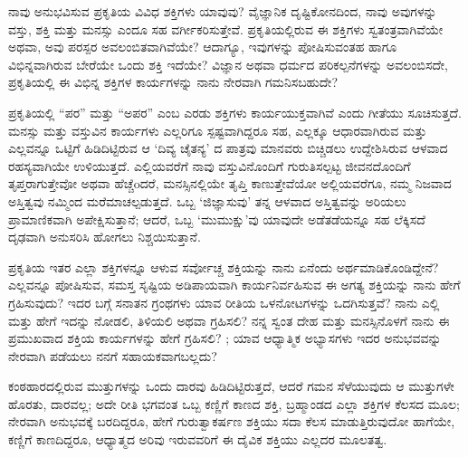 \begin{mananam}{}
\nfntmtxt ನಾವು ಅನುಭವಿಸುವ ಪ್ರಕೃತಿಯ ವಿವಿಧ ಶಕ್ತಿಗಳು ಯಾವುವು?  ವೈಜ್ಞಾನಿಕ ದೃಷ್ಟಿಕೋನದಿಂದ, ನಾವು ಅವುಗಳನ್ನು ವಸ್ತು, ಶಕ್ತಿ ಮತ್ತು ಮನಸ್ಸು ಎಂದೂ ಸಹ ವರ್ಗೀಕರಿಸುತ್ತೇವೆ. ಪ್ರಕೃತಿಯಲ್ಲಿರುವ ಈ ಶಕ್ತಿಗಳು ಸ್ವತಂತ್ರವಾಗಿವೆಯೇ ಅಥವಾ, ಅವು ಪರಸ್ಪರ ಅವಲಂಬಿತವಾಗಿವೆಯೇ? ಆದಾಗ್ಯೂ, ಇವುಗಳನ್ನು ಪೋಷಿಸುವಂತಹ ಹಾಗೂ ವಿಭಿನ್ನವಾಗಿರುವ ಬೇರೆಯೇ ಒಂದು ಶಕ್ತಿ ಇದೆಯೇ? ವಿಜ್ಞಾನ ಅಥವಾ ಧರ್ಮದ ಪರಿಕಲ್ಪನೆಗಳನ್ನು ಅವಲಂಬಿಸದೇ, ಪ್ರಕೃತಿಯಲ್ಲಿ ಈ ವಿಭಿನ್ನ ಶಕ್ತಿಗಳ ಕಾರ್ಯಗಳನ್ನು ನಾನು ನೇರವಾಗಿ ಗಮನಿಸಬಹುದೇ?
\end{mananam}
\sReflect
\begin{inspiration}{}
\nfntmtxt ಪ್ರಕೃತಿಯಲ್ಲಿ “ಪರ” ಮತ್ತು “ಅಪರ” ಎಂಬ ಎರಡು ಶಕ್ತಿಗಳು ಕಾರ್ಯಯುಕ್ತವಾಗಿವೆ ಎಂದು ಗೀತೆಯು ಸೂಚಿಸುತ್ತದೆ. ಮನಸ್ಸು ಮತ್ತು ವಸ್ತುವಿನ ಕಾರ್ಯಗಳು ಎಲ್ಲರಿಗೂ ಸ್ಪಷ್ಟವಾಗಿದ್ದರೂ ಸಹ, ಎಲ್ಲಕ್ಕೂ ಆಧಾರವಾಗಿರುವ ಮತ್ತು ಎಲ್ಲವನ್ನೂ ಒಟ್ಟಿಗೆ ಹಿಡಿದಿಟ್ಟಿರುವ ಆ  ‘ದಿವ್ಯ ಚೈತನ್ಯ’ ದ  ಪಾತ್ರವು ಮಾನವರು ಬಿಚ್ಚಿಡಲು ಉದ್ದೇಶಿಸಿರುವ ಆಳವಾದ ರಹಸ್ಯವಾಗಿಯೇ ಉಳಿಯುತ್ತದೆ. ಎಲ್ಲಿಯವರೆಗೆ ನಾವು ವಸ್ತುವಿನೊಂದಿಗೆ ಗುರುತಿಸಲ್ಪಟ್ಟ ಜೀವನದೊಂದಿಗೆ ತೃಪ್ತರಾಗುತ್ತೇವೋ ಅಥವಾ ಹೆಚ್ಚೆoದರೆ, ಮನಸ್ಸಿನಲ್ಲಿಯೇ ತೃಪ್ತಿ ಕಾಣುತ್ತೇವೆಯೋ ಅಲ್ಲಿಯವರೆಗೂ, ನಮ್ಮ ನಿಜವಾದ ಅಸ್ತಿತ್ವವು ನಮ್ಮಿಂದ ಮರೆಮಾಚಲ್ಪಡುತ್ತದೆ. ಒಬ್ಬ ‘ಜಿಜ್ಞಾಸುವು’ ತನ್ನ ಆಳವಾದ ಅಸ್ತಿತ್ವವನ್ನು ಅರಿಯಲು ಪ್ರಾಮಾಣಿಕವಾಗಿ ಅಪೇಕ್ಷಿಸುತ್ತಾನೆ; ಆದರೆ,  ಒಬ್ಬ ‘ಮುಮುಕ್ಷು’ವು ಯಾವುದೇ ಅಡೆತಡೆಯನ್ನೂ ಸಹ ಲೆಕ್ಕಿಸದೆ ದೃಢವಾಗಿ  ಅನುಸರಿಸಿ ಹೋಗಲು ನಿಶ್ಚಯಿಸುತ್ತಾನೆ.
\end{inspiration}
\newpage

\begin{mananam}{}
\nfntmtxt ಪ್ರಕೃತಿಯ ಇತರ ಎಲ್ಲಾ ಶಕ್ತಿಗಳನ್ನೂ ಆಳುವ ಸರ್ವೋಚ್ಚ ಶಕ್ತಿಯನ್ನು ನಾನು ಏನೆಂದು ಅರ್ಥಮಾಡಿಕೊಂಡಿದ್ದೇನೆ?  ಎಲ್ಲವನ್ನೂ ಪೋಷಿಸುವ, ಸಮಸ್ತ ಸೃಷ್ಟಿಯ ಅಡಿಪಾಯವಾಗಿ ಕಾರ್ಯನಿರ್ವಹಿಸುವ ಈ ಅಗತ್ಯ ಶಕ್ತಿಯನ್ನು ನಾನು ಹೇಗೆ ಗ್ರಹಿಸುವುದು? ಇದರ ಬಗ್ಗೆ ಸನಾತನ ಗ್ರಂಥಗಳು  ಯಾವ ರೀತಿಯ ಒಳನೋಟಗಳನ್ನು ಒದಗಿಸುತ್ತವೆ? ನಾನು ಎಲ್ಲಿ ಮತ್ತು ಹೇಗೆ ಇದನ್ನು ನೋಡಲಿ, ತಿಳಿಯಲಿ ಅಥವಾ ಗ್ರಹಿಸಲಿ? ನನ್ನ ಸ್ವಂತ ದೇಹ ಮತ್ತು ಮನಸ್ಸಿನೊಳಗೆ ನಾನು ಈ ಪ್ರಮುಖವಾದ ಶಕ್ತಿಯ ಕಾರ್ಯಗಳನ್ನು ಹೇಗೆ ಗ್ರಹಿಸಲಿ? ; ಯಾವ ಆಧ್ಯಾತ್ಮಿಕ ಅಭ್ಯಾಸಗಳು ಇದರ ಅನುಭವವನ್ನು ನೇರವಾಗಿ ಪಡೆಯಲು ನನಗೆ ಸಹಾಯಕವಾಗಬಲ್ಲದು?
\end{mananam}
\sReflect
\begin{inspiration}{}
\nfntmtxt ಕಂಠಹಾರದಲ್ಲಿರುವ ಮುತ್ತುಗಳನ್ನು ಒಂದು ದಾರವು ಹಿಡಿದಿಟ್ಟಿರುತ್ತದೆ, ಆದರೆ ಗಮನ ಸೆಳೆಯುವುದು ಆ ಮುತ್ತುಗಳೇ ಹೊರತು, ದಾರವಲ್ಲ; ಅದೇ ರೀತಿ ಭಗವಂತ ಒಬ್ಬ ಕಣ್ಣಿಗೆ ಕಾಣದ ಶಕ್ತಿ, ಬ್ರಹ್ಮಾಂಡದ ಎಲ್ಲಾ ಶಕ್ತಿಗಳ ಕೆಲಸದ ಮೂಲ;  ನೇರವಾಗಿ ಅನುಭವಕ್ಕೆ ಬರದಿದ್ದರೂ, ಹೇಗೆ ಗುರುತ್ವಾಕರ್ಷಣ ಶಕ್ತಿಯು ಸದಾ ಕೆಲಸ ಮಾಡುತ್ತಿರುವುದೋ ಹಾಗೆಯೇ, ಕಣ್ಣಿಗೆ ಕಾಣದಿದ್ದರೂ, ಆಧ್ಯಾತ್ಮದ ಅರಿವು ಇರುವವರಿಗೆ ಈ ದೈವಿಕ ಶಕ್ತಿಯು ಎಲ್ಲದರ ಮೂಲತತ್ವ.
\end{inspiration}
\newpage

